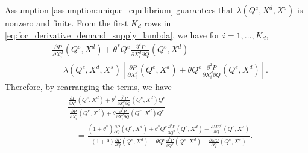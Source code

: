\documentclass[11pt, a4paper]{article}
\theoremstyle{remark}
\begin{document}
Assumption \ref{assumption:unique_equilibrium} guarantees that $\lambda(Q^e, X^{d}, X^{s})$ is nonzero and finite.
From the first $K_d$ rows in \eqref{eq:foc_derivative_demand_supply_lambda}, we have for $i = 1, \ldots, K_d$,
\begin{align}
    &\frac{\partial P}{\partial X^{d}_{i}}(Q^e, X^{d}) + \theta^{*} Q^e \frac{\partial^2 P}{\partial X^{d}_{i}\partial Q}(Q^e, X^{d})\\  
    &= \lambda(Q^e, X^{d}, X^{s})\left[ \frac{\partial P}{\partial X^{d}_{i}}(Q^e, X^{d}) + \theta Q^e \frac{\partial^2 P}{\partial X^{d}_{i}\partial Q}(Q^e, X^{d}) \right].
\end{align}
Therefore, by rearranging the terms, we have
\begin{align}
    &\frac{\frac{\partial P}{\partial X^{d}_i}(Q^e, X^{d}) + \theta^{*}\frac{\partial^2 P}{\partial X^{d}_{i}\partial Q}(Q^e, X^{d})Q^e }{\frac{\partial P}{\partial X^{d}_i}(Q^e, X^{d}) + \theta\frac{\partial^2 P}{\partial X^{d}_{i}\partial Q}(Q^e, X^{d})Q^e}\\
    &\quad = \frac{(1+\theta^{*})\frac{\partial P}{\partial Q}(Q^e, X^{d}) + \theta^{*} Q^e\frac{\partial^2 P}{\partial Q^2}(Q^e, X^{d}) - \frac{\partial MC^{*}}{\partial Q}(Q^e, X^{s})}{(1+\theta)\frac{\partial P}{\partial Q}(Q^e, X^{d}) + \theta Q^e\frac{\partial^2 P}{\partial Q^2}(Q^e, X^{d}) - \frac{\partial MC}{\partial Q}(Q^e, X^{s})}. \label{eq:lambda_foc_demand}
\end{align}
\end{document}
